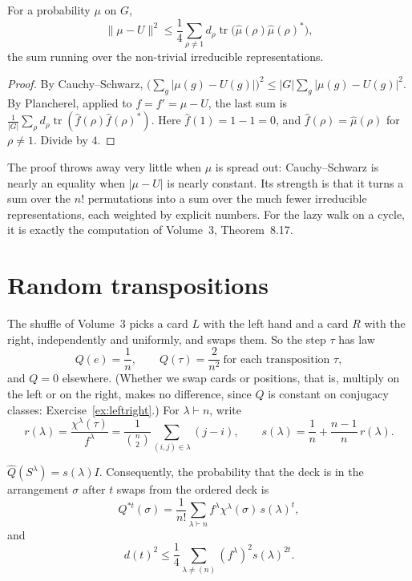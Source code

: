 \begin{lemma}\label{lem:upperbound}
For a probability $\mu$ on $G$,
\[
\|\mu-U\|^2\le\frac14\sum_{\rho\ne1}d_\rho\operatorname{tr}\bigl(\hat\mu(\rho)\hat\mu(\rho)^*\bigr),
\]
the sum running over the non-trivial irreducible representations.
\end{lemma}

\begin{proof}
By Cauchy--Schwarz, $\bigl(\sum_g|\mu(g)-U(g)|\bigr)^2\le|G|\sum_g|\mu(g)-U(g)|^2$. By Plancherel, applied to $f=f'=\mu-U$, the last sum is $\frac1{|G|}\sum_\rho d_\rho\operatorname{tr}(\hat f(\rho)\hat f(\rho)^*)$. Here $\hat f(1)=1-1=0$, and $\hat f(\rho)=\hat\mu(\rho)$ for $\rho\ne1$.
Divide by $4$.
\end{proof}

The proof throws away very little when $\mu$ is spread out: Cauchy--Schwarz is nearly an equality when $|\mu-U|$ is nearly constant. Its strength is that it turns a sum over the $n!$ permutations into a sum over the much fewer irreducible representations, each weighted by
explicit numbers. For the lazy walk on a cycle, it is exactly the computation of Volume~3, Theorem~8.17.

\section{Random transpositions}

The shuffle of Volume~3 picks a card $L$ with the left hand and a card $R$ with the right, independently and uniformly, and swaps them. So the step $\tau$ has law
\[
Q(e)=\frac1n,\qquad Q(\tau)=\frac2{n^2}\ \text{for each transposition }\tau,
\]
and $Q=0$ elsewhere. (Whether we swap cards or positions, that is, multiply on the left or on the right, makes no difference, since $Q$ is constant on conjugacy classes: Exercise~\ref{ex:leftright}.) For $\lambda\vdash n$, write
\[
r(\lambda)=\frac{\chi^\lambda(\tau)}{f^\lambda}=\frac1{\binom n2}\sum_{(i,j)\in\lambda}(j-i),\qquad s(\lambda)=\frac1n+\frac{n-1}n\,r(\lambda).
\]

\begin{proposition}\label{prop:eigenvalues}
$\hat Q(S^\lambda)=s(\lambda)I$. Consequently, the probability that the deck is in the arrangement $\sigma$ after $t$ swaps from the ordered deck is
\[
Q^{*t}(\sigma)=\frac1{n!}\sum_{\lambda\vdash n}f^\lambda\chi^\lambda(\sigma)\,s(\lambda)^t,
\]
and
\[
d(t)^2\le\frac14\sum_{\lambda\ne(n)}(f^\lambda)^2s(\lambda)^{2t}.
\]
\end{proposition}

